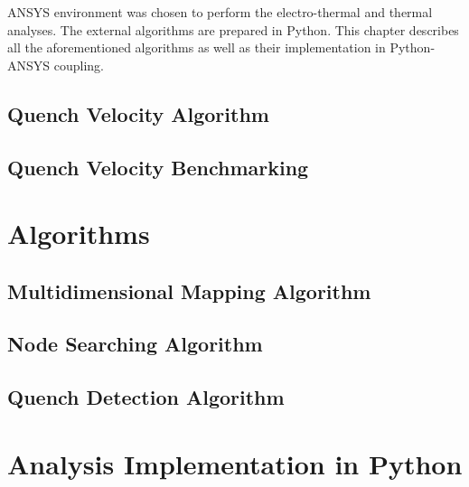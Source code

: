 \documentclass{article}
\begin{document}
ANSYS environment was chosen to perform the electro-thermal and thermal analyses. The external algorithms are prepared in Python. This chapter describes all the aforementioned algorithms as well as their implementation in Python-ANSYS coupling.

\subsection{Quench Velocity Algorithm}
\label{subsection:quench_velocity_algorithm}


\subsection{Quench Velocity Benchmarking}
\label{subsection:quench_velocity_benchmarking}


\clearpage
\section{Algorithms}
\label{section:algorithms}

\subsection{Multidimensional Mapping Algorithm}
\label{subsection:multidimensional_mapping_algorithm}


\subsection{Node Searching Algorithm}
\label{subsection:node_searching_algorithm}


\subsection{Quench Detection Algorithm}
\label{subsection:quench_detection_algorithm}


\clearpage
\section{Analysis Implementation in Python}
\label{section:python_implementation}

\end{document}

